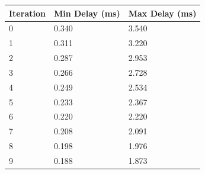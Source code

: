 \documentclass[12pt]{article}
\begin{document}
\begin{center}
	\begin{tabular}{ | l | l | l | }
	\hline
	Iteration & Min Delay (ms) & Max Delay (ms)\\ \hline
	0 & 0.340 & 3.540 \\ \hline                                                                                                                                                                                                                            
	1 & 0.311 & 3.220 \\ \hline                                                                                                                                                                                                                            
	2 & 0.287 & 2.953 \\ \hline                                                                                                                                                                                                                            
	3 & 0.266 & 2.728 \\ \hline                                                                                                                                                                                                                            
	4 & 0.249 & 2.534 \\ \hline                                                                                                                                                                                                                            
	5 & 0.233 & 2.367 \\ \hline                                                                                                                                                                                                                            
	6 & 0.220 & 2.220 \\ \hline                                                                                                                                                                                                                            
	7 & 0.208 & 2.091 \\ \hline                                                                                                                                                                                                                            
	8 & 0.198 & 1.976 \\ \hline                                                                                                                                                                                                                            
	9 & 0.188 & 1.873 \\ \hline
	\end{tabular}
\end{center}
\end{document}
